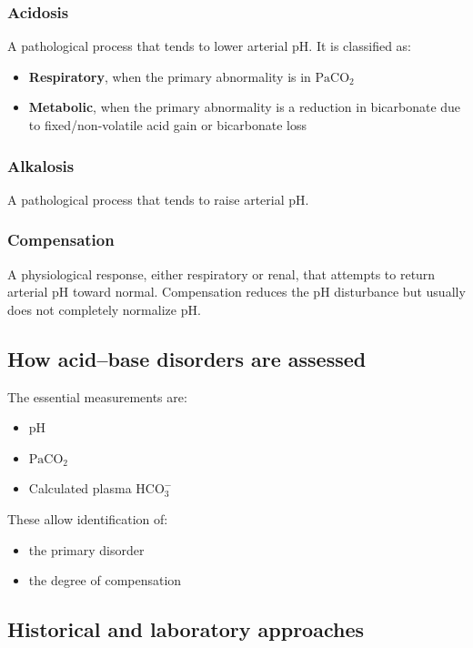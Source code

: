 \documentclass[11pt,a4paper]{article}
\begin{document}
\subsubsection{Acidosis}
A pathological process that tends to lower arterial pH. It is classified as:
\begin{itemize}
  \item \textbf{Respiratory}, when the primary abnormality is in \(\mathrm{PaCO_2}\)
  \item \textbf{Metabolic}, when the primary abnormality is a reduction in bicarbonate due to fixed/non-volatile acid gain or bicarbonate loss
\end{itemize}

\subsubsection{Alkalosis}
A pathological process that tends to raise arterial pH.

\subsubsection{Compensation}
A physiological response, either respiratory or renal, that attempts to return arterial pH toward normal. Compensation reduces the pH disturbance but usually does not completely normalize pH.

\subsection{How acid--base disorders are assessed}

The essential measurements are:
\begin{itemize}
  \item pH
  \item \(\mathrm{PaCO_2}\)
  \item Calculated plasma \(\mathrm{HCO_3^-}\)
\end{itemize}

These allow identification of:
\begin{itemize}
  \item the primary disorder
  \item the degree of compensation
\end{itemize}

\subsection{Historical and laboratory approaches}
\end{document}
